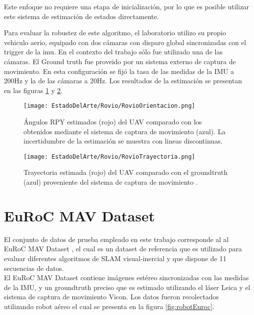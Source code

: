 Este enfoque no requiere una etapa de inicialización, por lo que es posible utilizar este sistema de estimación de estados directamente.


Para evaluar la robustez de este algoritmo, el laboratorio utilizo su propio vehiculo aerio, equipado con dos cámaras con disparo global sincronizadas con el trigger de la imu. En el contexto del trabajo sólo fue utilizado una de las cámaras. El Ground truth fue proveido por un sistema externo de captura de movimiento. En esta configuración se fijó la tasa de las medidas de la IMU a 200Hz y la de las cámaras a 20Hz. Los resultados de la estimación se presentan en las figuras \ref{fig:RovioOrientacion} y  \ref{fig:RovioTrayectoria}.



\begin{figure}[H]
	\centering
	\texttt{[image: EstadoDelArte/Rovio/RovioOrientacion.png]}
	\caption{Ángulos RPY estimados (rojo) del UAV comparado con los obtenidos mediante el sistema de captura de movimiento (azul). La incertidumbre de la estimación se muestra con lineas discontinuas. }
	\label{fig:RovioOrientacion}
\end{figure}


\begin{figure}[H]
	\centering
	\texttt{[image: EstadoDelArte/Rovio/RovioTrayectoria.png]}
	\caption{Trayectoria estimada (rojo) del UAV comparado con el groundtruth (azul) proveniente del sistema de captura de movimiento .}
	\label{fig:RovioTrayectoria}
\end{figure}



\section{EuRoC MAV Dataset}
El conjunto de datos de prueba empleado en este trabajo corresponde al al EuRoC MAV Dataset \cite{0}, el cual es un dataset de referencia que es utilizado para evaluar diferentes algoritmos de SLAM visual-inercial y que dispone de 11 secuencias de datos. \\


El EuRoC MAV Dataset contiene imágenes estéreo sincronizadas con las medidas de la IMU,  y un groundtruth preciso que es estimado utilizando el láser Leica y el sistema de captura de movimiento Vicon. Los datos fueron recolectados utilizando robot aéreo el cual se presenta en la figura \ref{fig:robotEuroc}. \\

